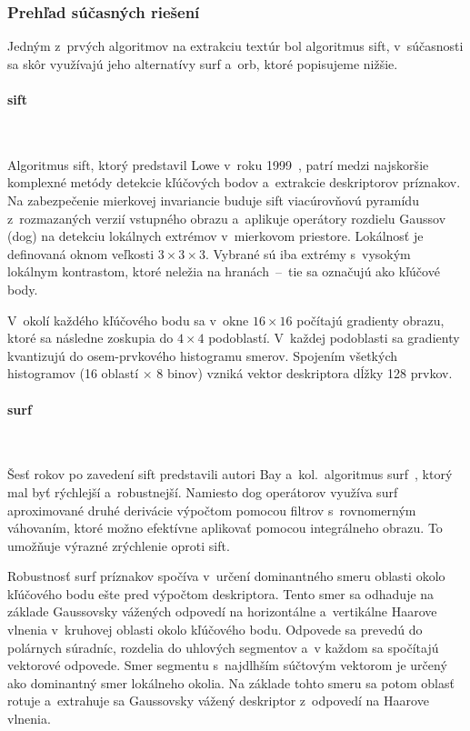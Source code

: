     \subsubsection{Prehľad súčasných riešení}

      Jedným z~prvých algoritmov na extrakciu textúr bol algoritmus \acrshort{sift}, v~súčasnosti sa skôr využívajú jeho alternatívy \acrshort{surf} a~\acrshort{orb}, ktoré popisujeme nižšie.

      \paragraph{\acrshort{sift}} \

        \noindent Algoritmus \acrshort{sift}, ktorý predstavil Lowe v~roku 1999~\cite{loweObjectRecognitionLocal1999}, patrí medzi najskoršie komplexné metódy detekcie kľúčových bodov a~extrakcie deskriptorov príznakov. Na zabezpečenie mierkovej invariancie buduje \acrshort{sift} viacúrovňovú pyramídu z~rozmazaných verzií vstupného obrazu a~aplikuje operátory rozdielu Gaussov (\acrshort{dog}) na detekciu lokálnych extrémov v~mierkovom priestore. Lokálnosť je definovaná oknom veľkosti $3 \times 3 \times 3$. Vybrané sú iba extrémy s~vysokým lokálnym kontrastom, ktoré neležia na hranách~--~tie sa označujú ako kľúčové body.

        V~okolí každého kľúčového bodu sa v~okne $16 \times 16$ počítajú gradienty obrazu, ktoré sa následne zoskupia do $4 \times 4$ podoblastí. V~každej podoblasti sa gradienty kvantizujú do osem-prvkového histogramu smerov. Spojením všetkých histogramov (16 oblastí $\times$ 8 binov) vzniká vektor deskriptora dĺžky 128 prvkov.

      \paragraph{\acrshort{surf}} \

        \noindent Šesť rokov po zavedení \acrshort{sift} predstavili autori Bay a~kol.\ algoritmus \acrshort{surf}~\cite{baySURFSpeededRobust2006}, ktorý mal byť rýchlejší a~robustnejší. Namiesto \acrshort{dog} operátorov využíva \acrshort{surf} aproximované druhé derivácie výpočtom pomocou filtrov s~rovnomerným váhovaním, ktoré možno efektívne aplikovať pomocou integrálneho obrazu. To umožňuje výrazné zrýchlenie oproti \acrshort{sift}.

        Robustnosť \acrshort{surf} príznakov spočíva v~určení dominantného smeru oblasti okolo kľúčového bodu ešte pred výpočtom deskriptora. Tento smer sa odhaduje na základe Gaussovsky vážených odpovedí na horizontálne a~vertikálne Haarove vlnenia v~kruhovej oblasti okolo kľúčového bodu. Odpovede sa prevedú do polárnych súradníc, rozdelia do uhlových segmentov a~v každom sa spočítajú vektorové odpovede. Smer segmentu s~najdlhším súčtovým vektorom je určený ako dominantný smer lokálneho okolia. Na základe tohto smeru sa potom oblasť rotuje a~extrahuje sa Gaussovsky vážený deskriptor z~odpovedí na Haarove vlnenia.

